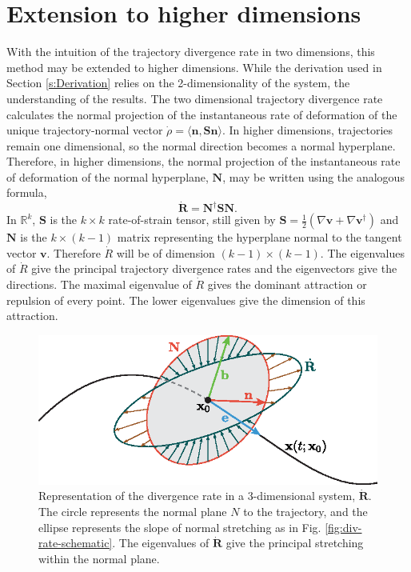 \documentclass[twocolumn]{svjour3}
\begin{document}
\section{Extension to higher dimensions}\label{s:HigherDimension}
With the intuition of the trajectory divergence rate in two dimensions, this method may be extended to higher dimensions. While the derivation used in Section \ref{s:Derivation} relies on the 2-dimensionality of the system, the understanding of the results. The two dimensional trajectory divergence rate calculates the normal projection of the instantaneous rate of deformation of the unique trajectory-normal vector $\dot{\rho} = \langle \mathbf{n}, \mathbf{S}\mathbf{n}\rangle$. In higher dimensions, trajectories remain one dimensional, so the normal direction becomes a normal hyperplane. Therefore, in higher dimensions, the normal projection of the instantaneous rate of deformation of the normal hyperplane, $\mathbf{N}$, may be written using the analogous formula,
\begin{equation}\label{eq:higherdim-reprate}
\dot{\mathbf{R}} = \mathbf{N}^\dagger \mathbf{S}\mathbf{N}.
\end{equation}
In $\mathbb{R}^k$, $\mathbf{S}$ is the $k\times k$ rate-of-strain tensor, still given by $\mathbf{S}=\tfrac{1}{2}\left(\nabla \mathbf{v}+\nabla \mathbf{v}^\dagger\right)$ and $\mathbf{N}$ is the $k \times (k-1)$ matrix representing the hyperplane normal to the tangent vector $\mathbf{v}$. Therefore $\dot{R}$ will be of dimension $(k-1) \times (k-1)$. The eigenvalues of $\dot{R}$ give the principal trajectory divergence rates and the eigenvectors give the directions. The maximal eigenvalue of $\dot{R}$ gives the dominant attraction or repulsion of every point. The lower eigenvalues give the dimension of this attraction.

\begin{figure}
\centering
\includegraphics[width=5in]{Figures/div-rate-3d-schematic.eps}
\caption{Representation of the divergence rate in a 3-dimensional system, $\dot{\textbf{R}}$. The circle represents the normal plane $N$ to the trajectory, and the ellipse represents the slope of normal stretching as in Fig. \ref{fig:div-rate-schematic}. The eigenvalues of $\dot{\mathbf{R}}$ give the principal stretching within the normal plane.}
\label{fig:3dDivRateSchematic}
\end{figure}
\end{document}
